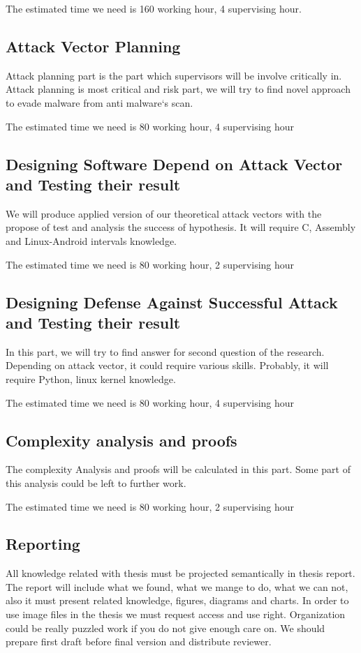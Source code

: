 The estimated time we need is 160 working hour, 4 supervising hour.
\subsection{Attack Vector Planning}
Attack planning part is the part which supervisors will be involve critically in. Attack planning is most critical and risk part, we will try to find novel approach to evade malware from anti malware`s scan. 

The estimated time we need is 80 working hour, 4 supervising hour
\subsection{Designing  Software Depend on Attack Vector and Testing their result}
We will produce applied version of our theoretical attack vectors with the propose of test and analysis the success of hypothesis. It will require C, Assembly and Linux-Android intervals knowledge.

The estimated time we need is 80 working hour, 2 supervising hour 
\subsection{Designing  Defense Against Successful Attack and Testing their result}
In this part, we will try to find answer for second question of the research. Depending on attack vector, it could require various skills. Probably, it will require Python, linux kernel knowledge.

The estimated time we need is 80 working hour, 4 supervising hour 
\subsection{Complexity analysis and proofs}
The complexity Analysis and proofs will be calculated in this part. Some part of this analysis could be left to further work. 

The estimated time we need is 80 working hour, 2 supervising hour 

\subsection{Reporting}
All knowledge related with thesis must be projected semantically in thesis report. The report will include what we found, what we mange to do, what we can not, also it must present related knowledge, figures, diagrams and charts. In order to use image files in the thesis we must request access and use right. Organization could be really puzzled work if you do not give enough care on. We should prepare first draft before final version and distribute reviewer.  

